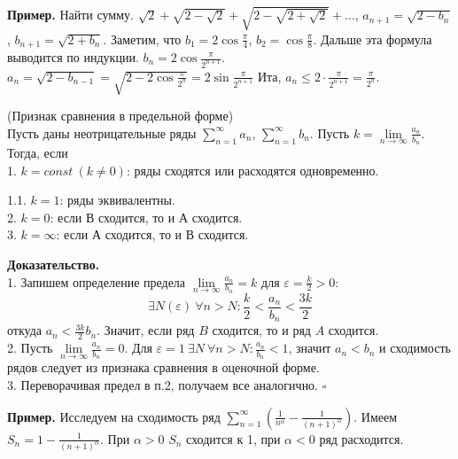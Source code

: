 \textbf{Пример.} Найти сумму. $\sqrt{2}+\sqrt{2-\sqrt{2} }+\sqrt{2-
\sqrt{2+\sqrt{2} } } +...$, $a_{n+1}=\sqrt{2-b_n} $, $b_{n+1}=\sqrt{2+b_n} $.
Заметим, что $b_1=2\cos\frac{\pi}{4}$, $b_2=\cos\frac{\pi}{8}$. Дальше
эта формула выводится по индукции. $b_n=2\cos\frac{\pi}{2^{n+1}}$. 
$a_n=\sqrt{2-b_{n-1}}=\sqrt{2-2\cos\frac{\pi}{2^n}}=2\sin\frac{\pi}{2^{n+1}}$ 
Ита, $a_n\leqslant 2\cdot \frac{\pi}{2^{n+1}}=\frac{\pi}{2^n}$.

\begin{theor}
    (Признак сравнения в предельной форме)\\
    Пусть даны неотрицательные ряды $\sum\limits_{n=1}^{\infty} a_n$, 
    $\sum\limits_{n=1}^{\infty}b_n$. Пусть $k=\lim\limits_{n \to \infty}
    \frac{a_n}{b_n}$. Тогда, если\\
1. $k=const~(k\ne 0)$: ряды сходятся или расходятся одновременно.

1.1. $k=1$: ряды эквивалентны.\\
2. $k=0$: если В сходится, то и А сходится.\\
3. $k=\infty$: если А сходится, то и В сходится.
\end{theor}
\textbf{Доказательство.}\\
1. Запишем определение предела $\lim\limits_{n \to \infty} \frac{a_n}{b_n}=k$
для $\varepsilon=\frac{k}{2}>0$:
$$\exists N(\varepsilon)~\forall n>N:\frac{k}{2}<\frac{a_n}{b_n}<\frac{3k}{2}$$
откуда $a_n<\frac{3k}{2}b_n$.
Значит, если ряд $B$ сходится, то и ряд $A$ сходится.\\
2. Пусть $\lim\limits_{n \to \infty}\frac{a_n}{b_n}=0$. Для $\varepsilon=1~
\exists N~\forall n>N: \frac{a_n}{b_n}<1$, 
значит $a_n<b_n$ и сходимость рядов следует из признака сравнения в оценочной 
форме.\\
3. Переворачивая предел в п.2, получаем все аналогично. $\square$ 

\textbf{Пример.} Исследуем на сходимость ряд
$\sum\limits_{n=1}^{\infty}(\frac{1}{n^\alpha}-
\frac{1}{(n+1)^\alpha})$. Имеем $S_n=1-\frac{1}{(n+1)^\alpha}$.
При $\alpha>0$ $S_n$ сходится к 1, при $\alpha<0$ ряд расходится.

